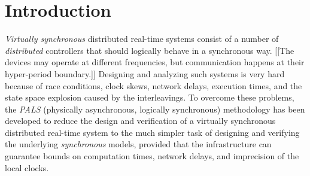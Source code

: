 

\section{Introduction}

\emph{Virtually synchronous} distributed real-time systems consist of
a number of \emph{distributed} controllers that should logically
behave in a synchronous way. [[The devices may operate at different
frequencies, but  communication happens at their hyper-period
boundary.]] Designing and analyzing  such systems is very hard because
of race conditions, clock skews, network delays, execution times, and
the state space explosion caused by the interleavings. To overcome
these problems, 
the \emph{PALS} (physically asynchronous, logically synchronous) methodology
\cite{pals-rtss09,mr-pals-journal,pals-tcs,al2012pattern} has been
developed to reduce the design and verification of a virtually
synchronous distributed real-time system to the much simpler task  of designing and
verifying the underlying \emph{synchronous} models,
provided that the  infrastructure can guarantee bounds
on computation times, network delays, and imprecision of the local clocks.







